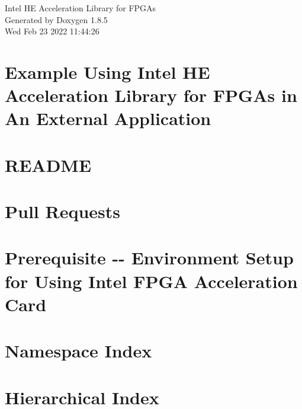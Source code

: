 \documentclass[twoside]{book}
\newcommand{\clearemptydoublepage}{%
  \newpage{\pagestyle{empty}\cleardoublepage}%
}
\begin{document}
\hypersetup{pageanchor=false}
\begin{titlepage}
\vspace*{7cm}
\begin{center}%
{\Large Intel H\-E Acceleration Library for F\-P\-G\-As }\\
\vspace*{1cm}
{\large Generated by Doxygen 1.8.5}\\
\vspace*{0.5cm}
{\small Wed Feb 23 2022 11:44:26}\\
\end{center}
\end{titlepage}
\clearemptydoublepage
\tableofcontents
\clearemptydoublepage
{}
\hypersetup{pageanchor=true}

\chapter{Example Using Intel H\-E Acceleration Library for F\-P\-G\-As in An External Application}
\label{md__disk1_ymeng12_hexl-fpga_examples_README}
\hypertarget{md__disk1_ymeng12_hexl-fpga_examples_README}{}

\chapter{R\-E\-A\-D\-M\-E}
\label{md__disk1_ymeng12_hexl-fpga_README}
\hypertarget{md__disk1_ymeng12_hexl-fpga_README}{}

\chapter{Pull Requests}
\label{md__disk1_ymeng12_hexl-fpga_CONTRIBUTING}
\hypertarget{md__disk1_ymeng12_hexl-fpga_CONTRIBUTING}{}

\chapter{Prerequisite -\/-\/ Environment Setup for Using Intel F\-P\-G\-A Acceleration Card}
\label{md__disk1_ymeng12_hexl-fpga_PREREQUISITE}
\hypertarget{md__disk1_ymeng12_hexl-fpga_PREREQUISITE}{}

\chapter{Namespace Index}

\chapter{Hierarchical Index}

\end{document}
